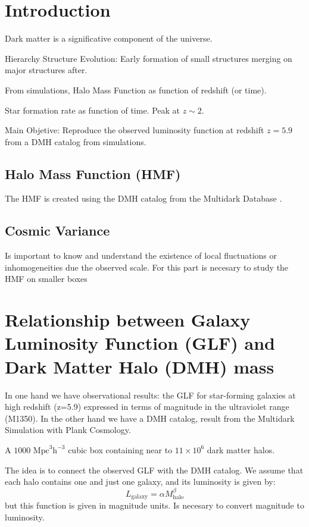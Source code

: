 \section{Introduction}

Dark matter is a significative component of the universe.

\citep{trimble87}

Hierarchy Structure Evolution: Early formation of small structures
merging on major structures after.

From simulations, Halo Mass Function as function of redshift (or time).

Star formation rate as function of time. Peak at $z\sim 2$.

Main Objetive: Reproduce the observed luminosity function at redshift $z=5.9$
from a DMH catalog from simulations. 

  \subsection{Halo Mass Function (HMF)}
  
  The HMF is created using the DMH catalog from the Multidark Database 
\citep{riebe13}.
  
  
  \subsection{Cosmic Variance}
  
  Is important to know and understand the existence of local fluctuations   or 
inhomogeneities due the observed scale.  For this part is necesary to study the 
HMF on smaller boxes

\section{Relationship between Galaxy Luminosity Function (GLF) and
  Dark Matter Halo (DMH) mass}

  In one hand we have observational results: the GLF for star-forming galaxies 
at high redshift (z=5.9)\citep{bouwens06,willott13}  expressed in terms of 
magnitude in the ultraviolet range (M1350). In the other hand we have a DMH  
catalog, result from the Multidark Simulation with Plank Cosmology. 

  A $1000 \textrm{ Mpc} ^3 \textrm{h}^{−3}$ cubic box containing near to  
$11\times10^6$ dark matter halos.

  The idea is to connect the observed GLF with the DMH catalog. We assume that  
each halo contains one and just one galaxy, and its luminosity is given by:
  \begin{equation}
  L_\textrm{galaxy}=\alpha M_\textrm{halo}^\beta 
  \end{equation}
but this function is given in magnitude units. Is necesary to convert 
magnitude to luminosity.

